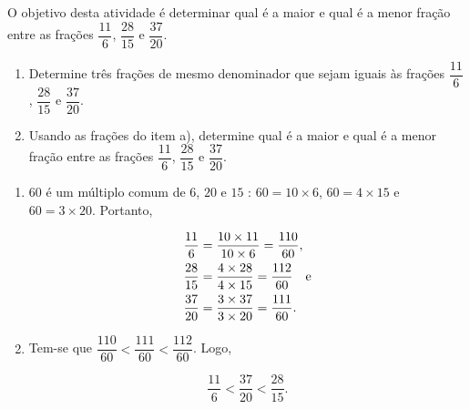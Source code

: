 \documentclass[10 pt,usenames,dvipsnames, oneside]{article}
\begin{document}
O objetivo desta atividade é determinar qual é a maior e qual é a menor fração entre
as frações $\dfrac{11}{6}$, $\dfrac{28}{15}$ e $\dfrac{37}{20}$.

\begin{enumerate} %
  \item     Determine três frações de mesmo denominador que sejam iguais às frações     $\dfrac{11}{6}$,     $\dfrac{28}{15}$ e     $\dfrac{37}{20}$.
  \item     Usando as frações do item a), determine qual é a maior e qual é a menor fração entre as frações     $\dfrac{11}{6}$,     $\dfrac{28}{15}$ e     $\dfrac{37}{20}$.
\end{enumerate} %


\ifdefined\prof
\begin{solucao}

\begin{enumerate}
\item             $60$       é um múltiplo comum de       $6$,       $20$
   e       $15$      :       $60 = 10 \times 6$,       $60 = 4 \times 15$
e       $60 = 3 \times 20$. Portanto,       

\begin{align*}
\dfrac{11}{6} &= \dfrac{10 \times11}{10 \times 6} = \dfrac{110}{60},\\
\dfrac{28}{15} &= \dfrac{4\times 28}{4 \times 15} = \dfrac{112}{60} \quad {\rm  e}\\
\dfrac{37}{20} &= \dfrac{3 \times 37}{3 \times 20} = \dfrac{111}{60}.\\
\end{align*}
\mbox{} \newline
    \item       Tem-se que       $\dfrac{110}{60} < \dfrac{111}{60} <
\dfrac{112}{60}$. Logo,

  $$\dfrac{11}{6} < \dfrac{37}{20} < \dfrac{28}{15}.$$
\end{enumerate}

\end{solucao}
\fi
\end{document}

